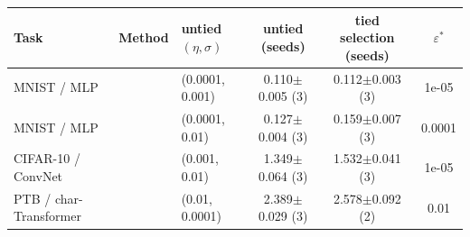 \begin{tabular}{l l l c c c}
\toprule
Task & Method & untied $(\eta,\sigma)$ & untied (seeds) & tied selection (seeds) & $\varepsilon^\ast$ \\
\midrule
MNIST / MLP & \ANP{} & (0.0001, 0.001) & 0.110$\pm$0.005 (3) & 0.112$\pm$0.003 (3) & 1e-05 \\
MNIST / MLP & \ANPb{} & (0.0001, 0.01) & 0.127$\pm$0.004 (3) & 0.159$\pm$0.007 (3) & 0.0001 \\
CIFAR-10 / ConvNet & \ANPb{} & (0.001, 0.01) & 1.349$\pm$0.064 (3) & 1.532$\pm$0.041 (3) & 1e-05 \\
PTB / char-Transformer & \DANP{} & (0.01, 0.0001) & 2.389$\pm$0.029 (3) & 2.578$\pm$0.092 (2) & 0.01 \\
\bottomrule
\end{tabular}
